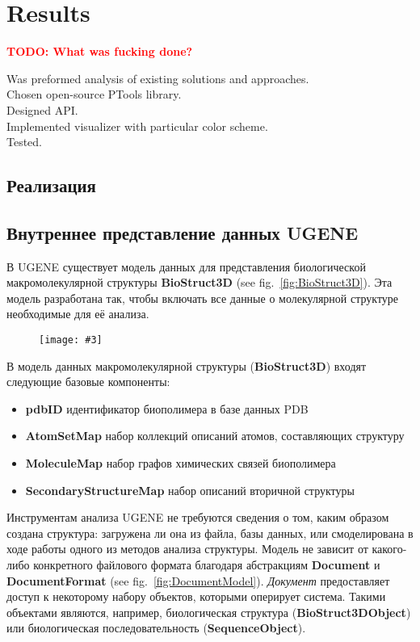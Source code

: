 \documentclass[a4paper, 12pt, titlepage, utf8]{extarticle}
\let\oldsection\section         %
\renewcommand{\section}{\newpage\oldsection}
\newenvironment{myfigure}[2]%
{\pushQED{\caption{#1} \label{#2}} %
    \begin{figure}[h!tb]\centering } %
{  \popQED %
    \end{figure}}
\newcommand{\includefigure}[3][]{
\begin{myfigure}{#2}{fig:#3}
    \texttt{[image: \#3]}
\end{myfigure}
}
\newcommand{\lookat}[1]{see fig.~\ref{#1}}
\newcommand{\ruclass}{\textit}
\newcommand{\class}{\textbf}
\newcommand{\todo}[1]{\textbf{\textcolor{red}{TODO: #1}}}
\begin{document}
\begin{original}
\begin{original}
\section{Results}
\todo{What was fucking done?}

Was preformed analysis of existing solutions and approaches.\\
Chosen open-source PTools library. \\
Designed API. \\
Implemented visualizer with particular color scheme. \\
Tested.\\

\begin{original}
\section{Реализация}
\subsection{Внутреннее представление данных UGENE}
В UGENE существует модель данных для представления биологической
макромолекулярной структуры \class{BioStruct3D} (\lookat{fig:BioStruct3D}). Эта
модель разработана так, чтобы включать все данные о молекулярной структуре
необходимые для её анализа.

\includefigure[scale=0.6]{Модель данных UGENE \class{BioStruct3D}}{BioStruct3D}

В модель данных макромолекулярной структуры (\class{BioStruct3D}) входят
следующие базовые компоненты:
\begin{itemize}
    \item \textbf{pdbID} идентификатор биополимера в базе данных PDB
    \item \textbf{AtomSetMap} набор коллекций описаний атомов, составляющих
структуру
    \item \textbf{MoleculeMap} набор графов химических связей биополимера
    \item \textbf{SecondaryStructureMap} набор описаний вторичной структуры
\end{itemize}

Инструментам анализа UGENE не требуются сведения о том, каким образом создана
структура: загружена ли она из файла, базы данных, или смоделирована в ходе
работы одного из методов анализа структуры. Модель не зависит от какого-либо
конкретного файлового формата  благодаря абстракциям \class{Document} и
\class{DocumentFormat} (\lookat{fig:DocumentModel}). \ruclass{Документ}
предоставляет доступ к некоторому набору объектов, которыми оперирует система.
Такими объектами являются, например, биологическая структура
(\class{BioStruct3DObject}) или биологическая последовательность
(\class{SequenceObject}).


\end{original}
\end{original}
\end{original}
\end{document}
